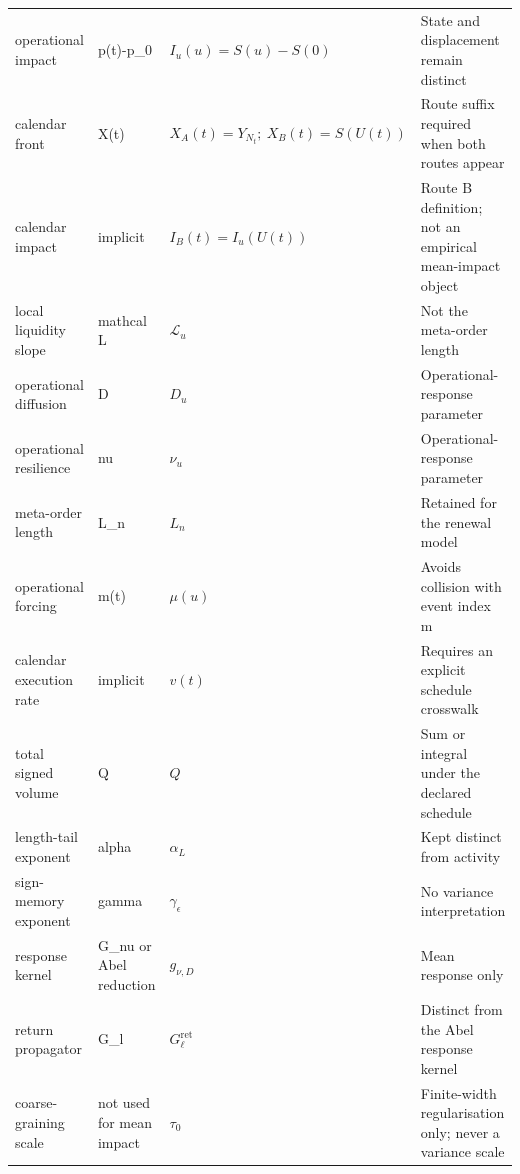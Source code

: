 \documentclass[10pt,a4paper,landscape]{article}
\begin{document}
\begin{longtable}{@{}>{\RaggedRight\arraybackslash}p{3.0cm}>{\RaggedRight\arraybackslash}p{4.2cm}>{\RaggedRight\arraybackslash}p{5.0cm}>{\RaggedRight\arraybackslash}p{12.0cm}@{}}
operational impact & p(t)-p\_0 & \(I_u(u)=S(u)-S(0)\) & State and displacement remain distinct \\
calendar front & X(t) & \(X_A(t)=Y_{N_t};\ X_B(t)=S(U(t))\) & Route suffix required when both routes appear \\
calendar impact & implicit & \(I_B(t)=I_u(U(t))\) & Route B definition; not an empirical mean-impact object \\
local liquidity slope & mathcal L & \(\mathcal L_u\) & Not the meta-order length \\
operational diffusion & D & \(D_u\) & Operational-response parameter \\
operational resilience & nu & \(\nu_u\) & Operational-response parameter \\
meta-order length & L\_n & \(L_n\) & Retained for the renewal model \\
operational forcing & m(t) & \(\mu(u)\) & Avoids collision with event index m \\
calendar execution rate & implicit & \(v(t)\) & Requires an explicit schedule crosswalk \\
total signed volume & Q & \(Q\) & Sum or integral under the declared schedule \\
length-tail exponent & alpha & \(\alpha_L\) & Kept distinct from activity \\
sign-memory exponent & gamma & \(\gamma_\epsilon\) & No variance interpretation \\
response kernel & G\_nu or Abel reduction & \(g_{\nu,D}\) & Mean response only \\
return propagator & G\_l & \(G^{\mathrm{ret}}_\ell\) & Distinct from the Abel response kernel \\
coarse-graining scale & not used for mean impact & \(\tau_0\) & Finite-width regularisation only; never a variance scale \\
\end{longtable}
\end{document}
